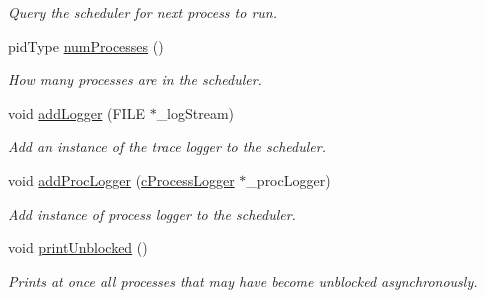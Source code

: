 \begin{DoxyCompactItemize}
\begin{DoxyCompactList}\small\item\em \-Query the scheduler for next process to run. \end{DoxyCompactList}\item 
pid\-Type \hyperlink{classcFCFS_a0a72de791436a84120a534dd2fa0485d}{num\-Processes} ()
\begin{DoxyCompactList}\small\item\em \-How many processes are in the scheduler. \end{DoxyCompactList}\item 
void \hyperlink{classcFCFS_accb887eae7016719ce770d7b0284adea}{add\-Logger} (\-F\-I\-L\-E $\ast$\-\_\-log\-Stream)
\begin{DoxyCompactList}\small\item\em \-Add an instance of the trace logger to the scheduler. \end{DoxyCompactList}\item 
void \hyperlink{classcFCFS_a4da9f2fa83516ac5859772ae09169343}{add\-Proc\-Logger} (\hyperlink{classcProcessLogger}{c\-Process\-Logger} $\ast$\-\_\-proc\-Logger)
\begin{DoxyCompactList}\small\item\em \-Add instance of process logger to the scheduler. \end{DoxyCompactList}\item 
void \hyperlink{classcFCFS_a37af1bbb7393f800a24ff22ee443f876}{print\-Unblocked} ()
\begin{DoxyCompactList}\small\item\em \-Prints at once all processes that may have become unblocked asynchronously. \end{DoxyCompactList}\end{DoxyCompactItemize}
